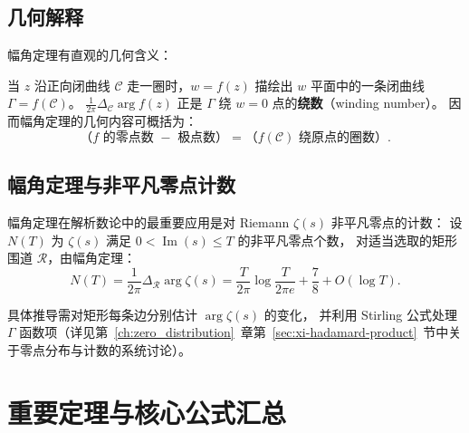 \subsection{几何解释}

幅角定理有直观的几何含义：

当 $z$ 沿正向闭曲线 $\mathcal{C}$ 走一圈时，$w=f(z)$ 描绘出 $w$ 平面中的一条闭曲线 $\Gamma=f(\mathcal{C})$。
$\frac{1}{2\pi}\Delta_{\mathcal{C}}\arg f(z)$ 正是 $\Gamma$ 绕 $w=0$ 点的\textbf{绕数}（winding number）。
因而幅角定理的几何内容可概括为：
\[
  \text{（$f$ 的零点数 $-$ 极点数）}
  = \text{（$f(\mathcal{C})$ 绕原点的圈数）}.
\]

\subsection{幅角定理与非平凡零点计数}

幅角定理在解析数论中的最重要应用是对 Riemann $\zeta(s)$ 非平凡零点的计数：
设 $N(T)$ 为 $\zeta(s)$ 满足 $0<\operatorname{Im}(s)\le T$ 的非平凡零点个数，
对适当选取的矩形围道 $\mathcal{R}$，由幅角定理：
\begin{equation}
  N(T) = \frac{1}{2\pi}\Delta_{\mathcal{R}}\arg\zeta(s)
  = \frac{T}{2\pi}\log\frac{T}{2\pi e} + \frac{7}{8} + O(\log T).
  \label{eq:NT}
\end{equation}

具体推导需对矩形每条边分别估计 $\arg\zeta(s)$ 的变化，
并利用 Stirling 公式处理 $\Gamma$ 函数项（详见第~\ref{ch:zero_distribution}~章第~\ref{sec:xi-hadamard-product}~节中关于零点分布与计数的系统讨论）。

\section{重要定理与核心公式汇总}

